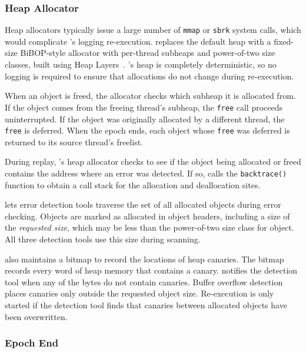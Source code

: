 
\subsubsection*{Heap Allocator}
\label{sec:heapallocator}

Heap allocators typically issue a large number of \texttt{mmap} or \texttt{sbrk} system calls, which would complicate \doubletake{}'s logging re-execution. \doubletake{} replaces the default heap with a fixed-size BiBOP-style allocator with per-thread subheaps and power-of-two size classes, built using Heap Layers~\cite{heaplayers}. \doubletake{}'s heap is completely deterministic, so no logging is required to ensure that allocations do not change during re-execution.

When an object is freed, the allocator checks which subheap it is allocated from. If the object comes from the freeing thread's subheap, the \texttt{free} call proceeds uninterrupted. If the object was originally allocated by a different thread, the \texttt{free} is deferred. When the epoch ends, each object whose \texttt{free} was deferred is returned to its source thread's freelist.

During replay, \doubletake{}'s heap allocator checks to see if the object being allocated or freed contains the address where an error was detected. If so, \doubletake{} calls the \texttt{backtrace()} function to obtain a call stack for the allocation and deallocation sites.

\doubletake{} lets error detection tools traverse the set of all allocated objects during error checking. Objects are marked as allocated in object headers, including a size of the \emph{requested size}, which may be less than the power-of-two size class for object. All three detection tools use this size during scanning.

\doubletake{} also maintains a bitmap to record the locations of heap canaries. The bitmap records every word of heap memory that contains a canary. \doubletake{} notifies the detection tool when any of the bytes do not contain canaries. Buffer overflow detection places canaries only outside the requested object size. Re-execution is only started if the detection tool finds that canaries between allocated objects have been overwritten.


\subsubsection*{Epoch End}

